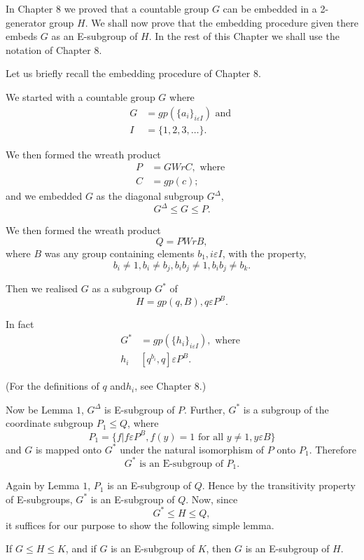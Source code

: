 In Chapter $8$ we proved that a countable group $G$ can be embedded in
a 2-generator group $H$. We shall now prove that the embedding
procedure given there embeds $G$ as an E-subgroup of $H$. In the rest
of this Chapter we shall use the notation of Chapter $8$. 

Let us briefly recall the embedding procedure of Chapter $8$. 

We started with a  countable group $G$ where 
\begin{align*}
  G & = gp(\big\{ a_i \big\}_{i \varepsilon I}) \text{ and }\\
  I & = \big\{ 1,2,3, \ldots \big\}.
\end{align*}

We then formed the wreath product 
\begin{align*}
  P& = GW r C, \text{ where }\\
  C& = gp(c) ;
\end{align*}
and we embedded $G$ as the diagonal subgroup $G^{\Delta}$,
$$
G^{\Delta} \leq G \leq P.
$$

We then formed the wreath product 
$$
Q = PWr B,
$$
where $B$ was any group containing elements $b_1, i \varepsilon I$,
with the property, 
$$
b_i \neq 1, b_i \neq b_j,  b_i b_j \neq 1, b_i b_j \neq b_k.
$$

Then we realised $G$ as a subgroup $G^*$ of 
$$
H = gp(q,B),  q \varepsilon P^B.
$$

In fact 
\begin{align*}
  G^* & = gp(\big\{ h_i \big \}_{i \varepsilon I}), \text{ where }\\
  h_i & [q^{b_i}, q ] \varepsilon P^B.
\end{align*}

(For the definitions of $q$ and$h_i$, see Chapter $8$.)

Now be Lemma $1$, $G^{\Delta}$ is E-subgroup of $P$. Further, $G^*$ is
a subgroup of the coordinate subgroup $P_1 \leq Q$, where  
$$
P_1 = \Bigg\{f \Bigg| f \varepsilon P^B, f(y) = 1 \text{ for all } y
\neq 1, y \varepsilon B \Bigg\} 
$$
and $G$ is mapped onto $G^*$ under the natural isomorphism of $P$ onto
$P_1$. Therefore 
$$
G^* \text{ is an E-subgroup of } P_1.
$$

Again by Lemma $1$, $P_1$ is an E-subgroup of $Q$. Hence by the
transitivity property of E-subgroups, $G^*$ is an E-subgroup of
$Q$. Now, since  
$$
G^* \leq H \leq Q,
$$
it suffices for our purpose to show the following simple lemma.
\begin{Lemma}%
  If $G \leq H \leq K$, and if $G$ is an E-subgroup of $K$, then $G$
  is an E-subgroup of $H$. 
\end{Lemma}

